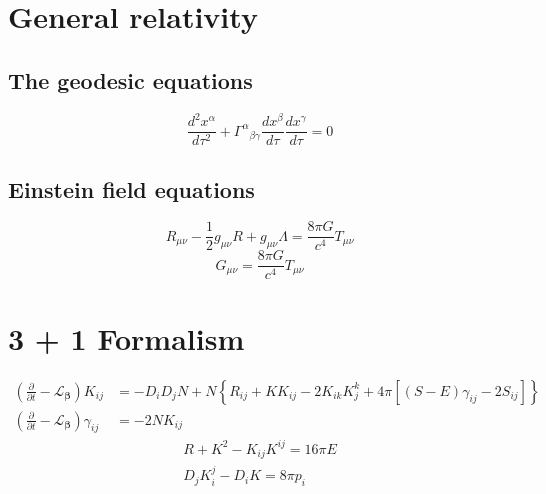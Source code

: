 %
%
%
%
%
\section{General relativity}



%
%
\subsection{The geodesic equations}
\begin{equation}
  \frac{d^2 x^\alpha }{d\tau^2} + {\Gamma^\alpha }_{\beta \gamma } \frac{dx^\beta }{d\tau } \frac{dx^\gamma }{d\tau } = 0
\end{equation}


%
%
\subsection{Einstein field equations}
\[ R_{\mu \nu } - \frac{1}{2} g_{\mu \nu }R + g_{\mu \nu }\Lambda = \frac{8\pi G}{c^4} T_{\mu \nu } \]
\[ G_{\mu \nu } = \frac{8\pi G}{c^4} T_{\mu \nu } \]



%
%
%
%
%
\section{3 + 1 Formalism}



%
%
\begin{align}
  \left( \frac{\partial}{\partial t} - {\mathcal L}_{\boldsymbol \beta} \right) K_{ij}
    & = -D_iD_j N + N \left\{ R_{ij} + KK_{ij} - 2K_{ik} K^k_j + 4\pi \left[ \left( S-E \right) \gamma_{ij} - 2S_{ij} \right] \right\} \\
  \left( \frac{\partial}{\partial t} - {\mathcal L}_{\boldsymbol \beta} \right) \gamma_{ij}
    & = -2NK_{ij}
\end{align}
\begin{gather}
  R + K^2 - K_{ij} K^{ij} = 16\pi E \\
  D_j K^j_i - D_i K = 8\pi p_i
\end{gather}
